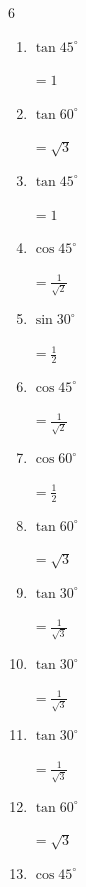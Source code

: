 \begin{multicols}{6}
\begin{enumerate}
        $\displaystyle =\frac{\sqrt{3}}{2}$

\columnbreak %

  \item $\displaystyle \tan{45^\circ}$

        $\displaystyle =1$

  \item $\displaystyle \tan{60^\circ}$

        $\displaystyle =\sqrt{3}$

  \item $\displaystyle \tan{45^\circ}$

        $\displaystyle =1$

  \item $\displaystyle \cos{45^\circ}$

        $\displaystyle =\frac{1}{\sqrt{2}}$

  \item $\displaystyle \sin{30^\circ}$

        $\displaystyle =\frac{1}{2}$

  \item $\displaystyle \cos{45^\circ}$

        $\displaystyle =\frac{1}{\sqrt{2}}$

  \item $\displaystyle \cos{60^\circ}$

        $\displaystyle =\frac{1}{2}$

  \item $\displaystyle \tan{60^\circ}$

        $\displaystyle =\sqrt{3}$

  \item $\displaystyle \tan{30^\circ}$

        $\displaystyle =\frac{1}{\sqrt{3}}$

  \item $\displaystyle \tan{30^\circ}$

        $\displaystyle =\frac{1}{\sqrt{3}}$

  \item $\displaystyle \tan{30^\circ}$

        $\displaystyle =\frac{1}{\sqrt{3}}$

  \item $\displaystyle \tan{60^\circ}$

        $\displaystyle =\sqrt{3}$

  \item $\displaystyle \cos{45^\circ}$


\end{enumerate}
\end{multicols}
